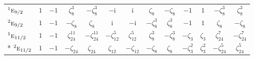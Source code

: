 \documentclass[10pt,a4paper]{article}
\numberwithin{equation}{section}
\newcommand{\irr}[1]{\text{\normalfont\scshape #1}}
\newcommand{\conjpair}[1]{{}^{#1}}
\newcommand{\iunit}{\mathrm{i}}
\newcommand{\rootunity}[1]{\zeta_{#1}}
\begin{document}
{\begin{longtable}{@{}lcccccccccccc@{}}
$\conjpair{1}\irr{e}_{9/2}$ & $1$ & $-1$ & $\rootunity{8}^{3}$ & $-\rootunity{8}^{3}$ & $-\iunit{}$ & $\iunit{}$ & $\rootunity{8}$ & $-\rootunity{8}$ & $-1$ & $1$ & $-\rootunity{8}^{3}$ & $\rootunity{8}^{3}$\\
$\conjpair{2}\irr{e}_{9/2}$ & $1$ & $-1$ & $-\rootunity{8}$ & $\rootunity{8}$ & $\iunit{}$ & $-\iunit{}$ & $-\rootunity{8}^{3}$ & $\rootunity{8}^{3}$ & $-1$ & $1$ & $\rootunity{8}$ & $-\rootunity{8}$\\
$\conjpair{1}\irr{e}_{11/2}$ & $1$ & $-1$ & $\rootunity{24}^{11}$ & $-\rootunity{24}^{11}$ & $-\rootunity{12}^{5}$ & $\rootunity{12}^{5}$ & $\rootunity{8}^{3}$ & $-\rootunity{8}^{3}$ & $-\rootunity{3}$ & $\rootunity{3}$ & $\rootunity{24}^{7}$ & $-\rootunity{24}^{7}$\\*
$\conjpair{2}\irr{e}_{11/2}$ & $1$ & $-1$ & $-\rootunity{24}$ & $\rootunity{24}$ & $\rootunity{12}$ & $-\rootunity{12}$ & $-\rootunity{8}$ & $\rootunity{8}$ & $-\rootunity{3}^{2}$ & $\rootunity{3}^{2}$ & $-\rootunity{24}^{5}$ & $\rootunity{24}^{5}$\\
\bottomrule\end{longtable}}
\end{document}
